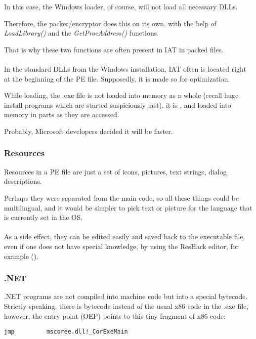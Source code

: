 In this case, the Windows loader, of course, will not load all necessary DLLs.

Therefore, the packer/encryptor does this on its own, with the help of
\emph{LoadLibrary()} and the \emph{GetProcAddress()} functions.

That is why these two functions are often present in \ac{IAT} in packed files.\\
\\
In the standard DLLs from the Windows installation, \ac{IAT} often is located right at the beginning of the PE file.
Supposedly, it is made so for optimization.

While loading, the .exe file is not loaded into memory as a whole (recall huge install programs which are
started suspiciously fast), it is , and loaded into memory in parts as they are accessed.

Probably, Microsoft developers decided it will be faster.

\subsubsection{Resources}

\label{PEresources}

Resources in a PE file are just a set of icons, pictures, text strings, dialog descriptions.

Perhaps they were separated from the main code, so all these things could be multilingual,
and it would be simpler to pick text or picture for the language that is currently set in the \ac{OS}. \\
\\
As a side effect, they can be edited easily and saved back to the executable file, even if one does not have special knowledge,
by using the ResHack editor, for example ().

\subsubsection{.NET}


.NET programs are not compiled into machine code but into a special bytecode.
Strictly speaking, there is bytecode instead of the usual x86 code
in the .exe file, however, the entry point (\ac{OEP}) points to this tiny fragment of x86 code:

\begin{lstlisting}[style=customasmx86]
jmp         mscoree.dll!_CorExeMain
\end{lstlisting}

